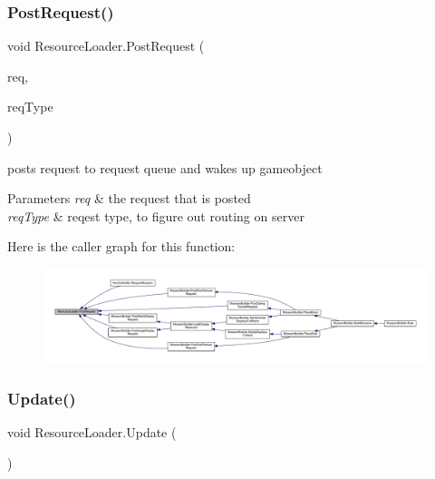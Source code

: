 \mbox{\label{class_resource_loader_abcaa27712f43f305baef3df7722c9e73}} 
\subsubsection{\texorpdfstring{Post\+Request()}{PostRequest()}}
{\footnotesize\ttfamily void Resource\+Loader.\+Post\+Request (\begin{DoxyParamCaption}\item[{\mbox{\hyperlink{interface_i_resource_request}{I\+Resource\+Request}}}]{req,  }\item[{\mbox{\hyperlink{class_resource_loader_a55469e5c9294ec83732bfa4e2c3135ab}{Request\+Type}}}]{req\+Type }\end{DoxyParamCaption})}



posts request to request queue and wakes up gameobject 


\begin{DoxyParams}{Parameters}
{\em req} & the request that is posted\\
\hline
{\em req\+Type} & reqest type, to figure out routing on server\\
\hline
\end{DoxyParams}
Here is the caller graph for this function\+:
\nopagebreak
\begin{figure}[H]
\begin{center}
\leavevmode
\includegraphics[width=350pt]{class_resource_loader_abcaa27712f43f305baef3df7722c9e73_icgraph}
\end{center}
\end{figure}
\mbox{\label{class_resource_loader_a20a1036648a453863c96b51d33edfa11}} 
\subsubsection{\texorpdfstring{Update()}{Update()}}
{\footnotesize\ttfamily void Resource\+Loader.\+Update (\begin{DoxyParamCaption}{ }\end{DoxyParamCaption})\hspace{0.3cm}{\ttfamily [private]}}





